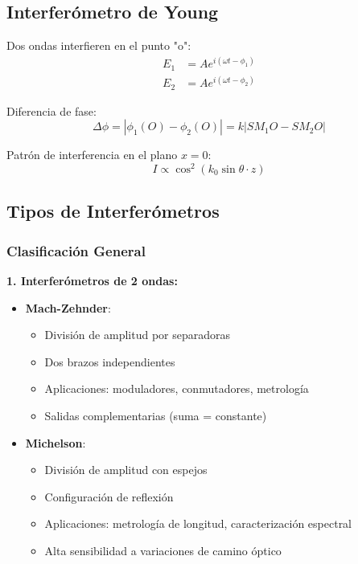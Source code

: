 \documentclass[11pt,a4paper]{article}
\begin{document}
\subsection{Interferómetro de Young}

Dos ondas interfieren en el punto "o":
\begin{align}
    E_1 &= A e^{i(\omega t - \phi_1)}\\
    E_2 &= A e^{i(\omega t - \phi_2)}
\end{align}

Diferencia de fase:
\begin{equation}
    \Delta\phi = |\phi_1(O) - \phi_2(O)| = k|SM_1O - SM_2O|
\end{equation}

Patrón de interferencia en el plano $x=0$:
\begin{equation}
    I \propto \cos^2(k_0 \sin\theta \cdot z)
\end{equation}

\subsection{Tipos de Interferómetros}

\subsubsection{Clasificación General}

\textbf{1. Interferómetros de 2 ondas:}
\begin{itemize}
    \item \textbf{Mach-Zehnder}: 
    \begin{itemize}
        \item División de amplitud por separadoras
        \item Dos brazos independientes
        \item Aplicaciones: moduladores, conmutadores, metrología
        \item Salidas complementarias (suma = constante)
    \end{itemize}
    
    \item \textbf{Michelson}:
    \begin{itemize}
        \item División de amplitud con espejos
        \item Configuración de reflexión
        \item Aplicaciones: metrología de longitud, caracterización espectral
        \item Alta sensibilidad a variaciones de camino óptico
    \end{itemize}
\end{itemize}
\end{document}
